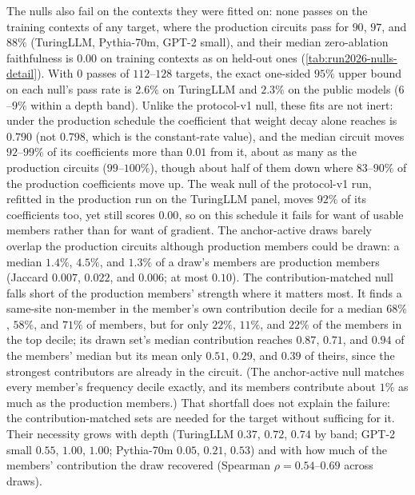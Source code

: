 The nulls also fail on the contexts they were fitted on: none passes on the training contexts of any target, where the production circuits pass for $90$, $97$, and $88\%$ (TuringLLM, Pythia-70m, GPT-2 small), and their median zero-ablation faithfulness is $0.00$ on training contexts as on held-out ones (\cref{tab:run2026-nulls-detail}).
With $0$ passes of $112$--$128$ targets, the exact one-sided $95\%$ upper bound on each null's pass rate is $2.6\%$ on TuringLLM and $2.3\%$ on the public models ($6$--$9\%$ within a depth band).
Unlike the protocol-v1 null, these fits are not inert: under the production schedule the coefficient that weight decay alone reaches is $0.790$ (not $0.798$, which is the constant-rate value), and the median circuit moves $92$--$99\%$ of its coefficients more than $0.01$ from it, about as many as the production circuits ($99$--$100\%$), though about half of them down where $83$--$90\%$ of the production coefficients move up.
The weak null of the protocol-v1 run, refitted in the production run on the TuringLLM panel, moves $92\%$ of its coefficients too, yet still scores $0.00$, so on this schedule it fails for want of usable members rather than for want of gradient.
The anchor-active draws barely overlap the production circuits although production members could be drawn: a median $1.4\%$, $4.5\%$, and $1.3\%$ of a draw's members are production members (Jaccard $0.007$, $0.022$, and $0.006$; at most $0.10$).
The contribution-matched null falls short of the production members' strength where it matters most.
It finds a same-site non-member in the member's own contribution decile for a median $68\%$, $58\%$, and $71\%$ of members, but for only $22\%$, $11\%$, and $22\%$ of the members in the top decile; its drawn set's median contribution reaches $0.87$, $0.71$, and $0.94$ of the members' median but its mean only $0.51$, $0.29$, and $0.39$ of theirs, since the strongest contributors are already in the circuit.
(The anchor-active null matches every member's frequency decile exactly, and its members contribute about $1\%$ as much as the production members.)
That shortfall does not explain the failure: the contribution-matched sets are needed for the target without sufficing for it.
Their necessity grows with depth (TuringLLM $0.37$, $0.72$, $0.74$ by band; GPT-2 small $0.55$, $1.00$, $1.00$; Pythia-70m $0.05$, $0.21$, $0.53$) and with how much of the members' contribution the draw recovered (Spearman $\rho = 0.54$--$0.69$ across draws).
